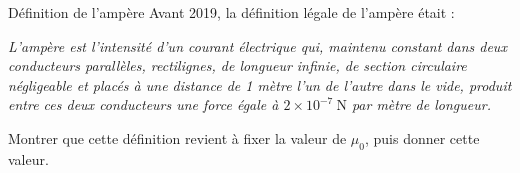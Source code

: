 \begin{exo}[PC][1][TD]{Définition de l'ampère}
Avant 2019, la définition légale de l'ampère était :
\begin{center}
	\begin{minipage}{0.8\textwidth}

		\emph{
			L’ampère est l'intensité d'un courant électrique qui, maintenu constant dans deux conducteurs parallèles, rectilignes, de longueur infinie, de section circulaire négligeable et placés à une distance de 1 mètre l'un de l'autre dans le vide, produit entre ces deux conducteurs une force égale à $2 \times 10^{-7} \mathrm{~N}$ par mètre de longueur.}
		\end{minipage}
\end{center}
Montrer que cette définition revient à fixer la valeur de $\mu_0$, puis donner cette valeur. 
\end{exo}


